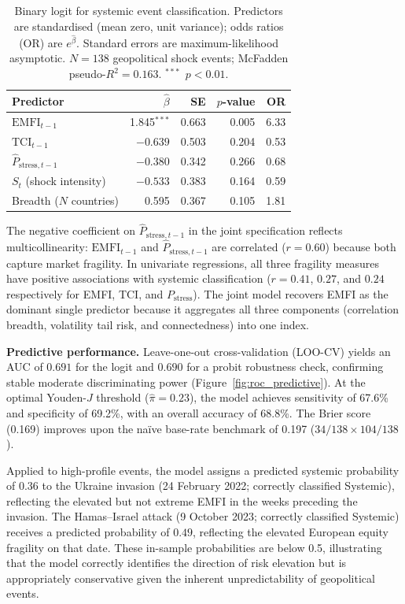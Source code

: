 \documentclass[11pt]{article}
\begin{document}
\begin{table}[htbp]
\centering
\small
\caption{Binary logit for systemic event classification.
  Predictors are standardised (mean zero, unit variance);
  odds ratios (OR) are $e^{\hat\beta}$.
  Standard errors are maximum-likelihood asymptotic.
  $N = 138$ geopolitical shock events; McFadden pseudo-$R^2 = 0.163$.
  $^{***}$~$p < 0.01$.}
\label{tab:predictive_logit}
\begin{tabular}{lrrrr}
\hline\hline
Predictor & $\hat\beta$ & SE & $p$-value & OR \\
\hline
$\mathrm{EMFI}_{t-1}$           &  1.845$^{***}$ & 0.663 & 0.005 & 6.33 \\
$\mathrm{TCI}_{t-1}$            & $-0.639$       & 0.503 & 0.204 & 0.53 \\
$\hat{P}_{\mathrm{stress},t-1}$ & $-0.380$       & 0.342 & 0.266 & 0.68 \\
$S_t$ (shock intensity)         & $-0.533$       & 0.383 & 0.164 & 0.59 \\
Breadth ($N$ countries)         &  0.595         & 0.367 & 0.105 & 1.81 \\
\hline\hline
\end{tabular}
\end{table}

The negative coefficient on $\hat{P}_{\mathrm{stress},t-1}$ in the joint
specification reflects multicollinearity: $\mathrm{EMFI}_{t-1}$ and
$\hat{P}_{\mathrm{stress},t-1}$ are correlated ($r = 0.60$) because both
capture market fragility.
In univariate regressions, all three fragility measures have positive associations
with systemic classification ($r = 0.41$, $0.27$, and $0.24$ respectively for
EMFI, TCI, and $P_{\mathrm{stress}}$).
The joint model recovers EMFI as the dominant single predictor because it
aggregates all three components (correlation breadth, volatility tail risk,
and connectedness) into one index.

\textbf{Predictive performance.}
Leave-one-out cross-validation (LOO-CV) yields an AUC of $0.691$ for the logit
and $0.690$ for a probit robustness check, confirming stable moderate discriminating
power (Figure~\ref{fig:roc_predictive}).
At the optimal Youden-$J$ threshold ($\hat\pi = 0.23$),
the model achieves sensitivity of 67.6\% and specificity of 69.2\%,
with an overall accuracy of 68.8\%.
The Brier score (0.169) improves upon the naïve base-rate benchmark of 0.197
($34/138 \times 104/138$).

Applied to high-profile events, the model assigns a predicted systemic probability of
$0.36$ to the Ukraine invasion (24 February 2022; correctly classified Systemic),
reflecting the elevated but not extreme EMFI in the weeks preceding the invasion.
The Hamas--Israel attack (9 October 2023; correctly classified Systemic) receives a
predicted probability of $0.49$, reflecting the elevated European equity fragility
on that date. These in-sample probabilities are below 0.5, illustrating that the model
correctly identifies the direction of risk elevation but is appropriately conservative
given the inherent unpredictability of geopolitical events.
\end{document}
